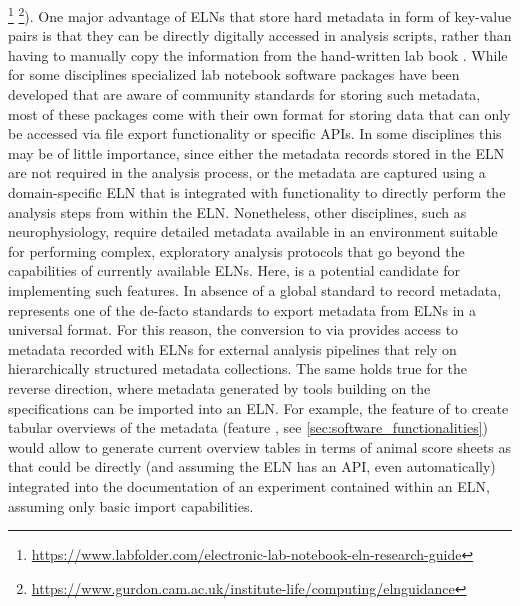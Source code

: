 \footnote{\url{https://www.labfolder.com/electronic-lab-notebook-eln-research-guide}} \footnote{\url{https://www.gurdon.cam.ac.uk/institute-life/computing/elnguidance}}). One major advantage of ELNs that store hard metadata \citep{Grewe_2011} in form of key-value pairs is that they can be directly digitally accessed in analysis scripts, rather than having to manually copy the information from the hand-written lab book \citep{Zehl_2016}. While for some disciplines specialized lab notebook software packages have been developed \citep{Kwok_2018} that are aware of community standards for storing such metadata, most of these packages come with their own format for storing data that can only be accessed via file export functionality or specific APIs. In some disciplines this may be of little importance, since either the metadata records stored in the ELN are not required in the analysis process, or the metadata are captured using a domain-specific ELN that is integrated with functionality to directly perform the analysis steps from within the ELN. Nonetheless, other disciplines, such as neurophysiology, require detailed metadata available in an environment suitable for performing complex, exploratory analysis protocols that go beyond the capabilities of currently available ELNs. Here,  is a potential candidate for implementing such features. In absence of a global standard to record metadata,  represents one of the de-facto standards to export metadata from ELNs in a universal format. For this reason, the conversion to  via  provides access to metadata recorded with ELNs for external analysis pipelines that rely on hierarchically structured metadata collections. The same holds true for the reverse direction, where metadata generated by tools building on the  specifications can be imported into an ELN. For example, the feature of  to create tabular overviews of the metadata (feature \fcompare, see \cref{sec:software_functionalities}) would allow to generate current overview tables in terms of animal score sheets as  that could be directly (and assuming the ELN has an API, even automatically) integrated into the documentation of an experiment contained within an ELN, assuming only basic  import capabilities. 

